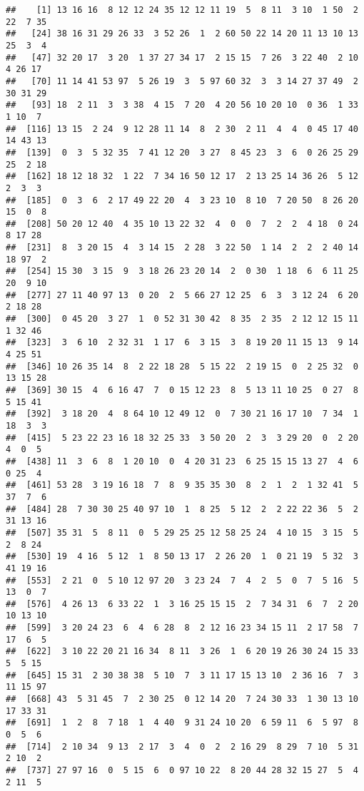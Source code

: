 \documentclass[]{article}
\begin{document}
\begin{verbatim}
##    [1] 13 16 16  8 12 12 24 35 12 12 11 19  5  8 11  3 10  1 50  2 22  7 35
##   [24] 38 16 31 29 26 33  3 52 26  1  2 60 50 22 14 20 11 13 10 13 25  3  4
##   [47] 32 20 17  3 20  1 37 27 34 17  2 15 15  7 26  3 22 40  2 10  4 26 17
##   [70] 11 14 41 53 97  5 26 19  3  5 97 60 32  3  3 14 27 37 49  2 30 31 29
##   [93] 18  2 11  3  3 38  4 15  7 20  4 20 56 10 20 10  0 36  1 33  1 10  7
##  [116] 13 15  2 24  9 12 28 11 14  8  2 30  2 11  4  4  0 45 17 40 14 43 13
##  [139]  0  3  5 32 35  7 41 12 20  3 27  8 45 23  3  6  0 26 25 29 25  2 18
##  [162] 18 12 18 32  1 22  7 34 16 50 12 17  2 13 25 14 36 26  5 12  2  3  3
##  [185]  0  3  6  2 17 49 22 20  4  3 23 10  8 10  7 20 50  8 26 20 15  0  8
##  [208] 50 20 12 40  4 35 10 13 22 32  4  0  0  7  2  2  4 18  0 24  8 17 28
##  [231]  8  3 20 15  4  3 14 15  2 28  3 22 50  1 14  2  2  2 40 14 18 97  2
##  [254] 15 30  3 15  9  3 18 26 23 20 14  2  0 30  1 18  6  6 11 25 20  9 10
##  [277] 27 11 40 97 13  0 20  2  5 66 27 12 25  6  3  3 12 24  6 20  2 18 28
##  [300]  0 45 20  3 27  1  0 52 31 30 42  8 35  2 35  2 12 12 15 11  1 32 46
##  [323]  3  6 10  2 32 31  1 17  6  3 15  3  8 19 20 11 15 13  9 14  4 25 51
##  [346] 10 26 35 14  8  2 22 18 28  5 15 22  2 19 15  0  2 25 32  0 13 15 28
##  [369] 30 15  4  6 16 47  7  0 15 12 23  8  5 13 11 10 25  0 27  8  5 15 41
##  [392]  3 18 20  4  8 64 10 12 49 12  0  7 30 21 16 17 10  7 34  1 18  3  3
##  [415]  5 23 22 23 16 18 32 25 33  3 50 20  2  3  3 29 20  0  2 20  4  0  5
##  [438] 11  3  6  8  1 20 10  0  4 20 31 23  6 25 15 15 13 27  4  6  0 25  4
##  [461] 53 28  3 19 16 18  7  8  9 35 35 30  8  2  1  2  1 32 41  5 37  7  6
##  [484] 28  7 30 30 25 40 97 10  1  8 25  5 12  2  2 22 22 36  5  2 31 13 16
##  [507] 35 31  5  8 11  0  5 29 25 25 12 58 25 24  4 10 15  3 15  5  2  8 24
##  [530] 19  4 16  5 12  1  8 50 13 17  2 26 20  1  0 21 19  5 32  3 41 19 16
##  [553]  2 21  0  5 10 12 97 20  3 23 24  7  4  2  5  0  7  5 16  5 13  0  7
##  [576]  4 26 13  6 33 22  1  3 16 25 15 15  2  7 34 31  6  7  2 20 10 13 10
##  [599]  3 20 24 23  6  4  6 28  8  2 12 16 23 34 15 11  2 17 58  7 17  6  5
##  [622]  3 10 22 20 21 16 34  8 11  3 26  1  6 20 19 26 30 24 15 33  5  5 15
##  [645] 15 31  2 30 38 38  5 10  7  3 11 17 15 13 10  2 36 16  7  3 11 15 97
##  [668] 43  5 31 45  7  2 30 25  0 12 14 20  7 24 30 33  1 30 13 10 17 33 31
##  [691]  1  2  8  7 18  1  4 40  9 31 24 10 20  6 59 11  6  5 97  8  0  5  6
##  [714]  2 10 34  9 13  2 17  3  4  0  2  2 16 29  8 29  7 10  5 31  2 10  2
##  [737] 27 97 16  0  5 15  6  0 97 10 22  8 20 44 28 32 15 27  5  4  2 11  5

\end{verbatim}
\end{document}
